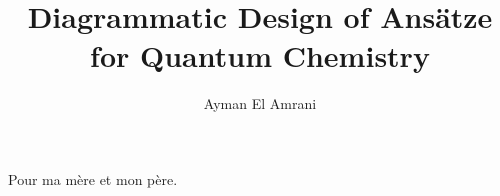 \documentclass[a4paper,nobind]{ociamthesis}  %
\title{Diagrammatic Design of Ansätze for Quantum Chemistry}
\author{Ayman El Amrani}
\begin{document}
\setlength{\textbaselineskip}{22pt}  %
\setlength{\frontmatterbaselineskip}{17pt plus1pt minus1pt} %
\setlength{\baselineskip}{\textbaselineskip}


\setcounter{secnumdepth}{1}  %
\setcounter{tocdepth}{1}  %


\begin{romanpages}
\maketitle

\begin{dedication}
Pour ma mère et mon père.
\end{dedication}


\begin{abstract}
	
\end{abstract}

\flushbottom  %

\tableofcontents

\end{romanpages}







% 





\end{document}
